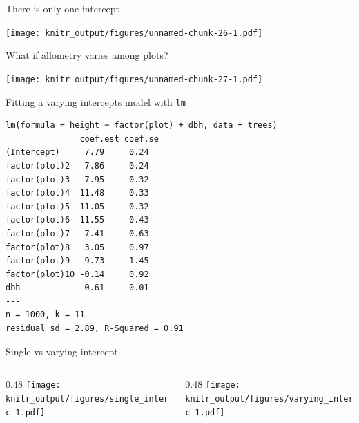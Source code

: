 \documentclass[10pt,ignorenonframetext,]{beamer}
\def\begincols{\begin{columns}[c]}
\def\endcols{\end{columns}}
\def\begincol{\begin{column}{0.48\textwidth}}
\def\endcol{\end{column}}
\begin{document}
\begin{frame}{There is only one intercept}

\texttt{[image: knitr\_output/figures/unnamed-chunk-26-1.pdf]}

\end{frame}

\begin{frame}{What if allometry varies among plots?}

\texttt{[image: knitr\_output/figures/unnamed-chunk-27-1.pdf]}

\end{frame}

\begin{frame}[fragile]{Fitting a varying intercepts model with
\texttt{lm}}

\begin{verbatim}
lm(formula = height ~ factor(plot) + dbh, data = trees)
               coef.est coef.se
(Intercept)     7.79     0.24  
factor(plot)2   7.86     0.24  
factor(plot)3   7.95     0.32  
factor(plot)4  11.48     0.33  
factor(plot)5  11.05     0.32  
factor(plot)6  11.55     0.43  
factor(plot)7   7.41     0.63  
factor(plot)8   3.05     0.97  
factor(plot)9   9.73     1.45  
factor(plot)10 -0.14     0.92  
dbh             0.61     0.01  
---
n = 1000, k = 11
residual sd = 2.89, R-Squared = 0.91
\end{verbatim}

\end{frame}

\begin{frame}{Single vs varying intercept}

\begincols
\begincol
\texttt{[image: knitr\_output/figures/single\_interc-1.pdf]} \endcol

\begincol
\texttt{[image: knitr\_output/figures/varying\_interc-1.pdf]} \endcol
\endcols

\end{frame}
\end{document}
